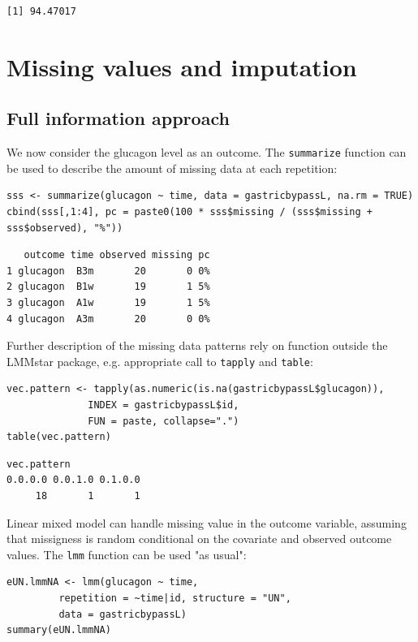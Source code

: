 \documentclass[12pt]{article}
\begin{document}
\begin{verbatim}
[1] 94.47017
\end{verbatim}



\clearpage

\section{Missing values and imputation}
\label{sec:orgdebd495}

\subsection{Full information approach}
\label{sec:org83ba683}

We now consider the glucagon level as an outcome. The \texttt{summarize}
function can be used to describe the amount of missing data at each
repetition:
\lstset{language=r,label= ,caption= ,captionpos=b,numbers=none}
\begin{lstlisting}
sss <- summarize(glucagon ~ time, data = gastricbypassL, na.rm = TRUE)
cbind(sss[,1:4], pc = paste0(100 * sss$missing / (sss$missing + sss$observed), "%"))
\end{lstlisting}

\begin{verbatim}
   outcome time observed missing pc
1 glucagon  B3m       20       0 0%
2 glucagon  B1w       19       1 5%
3 glucagon  A1w       19       1 5%
4 glucagon  A3m       20       0 0%
\end{verbatim}


Further description of the missing data patterns rely on function
outside the LMMstar package, e.g. appropriate call to \texttt{tapply} and
\texttt{table}:
\lstset{language=r,label= ,caption= ,captionpos=b,numbers=none}
\begin{lstlisting}
vec.pattern <- tapply(as.numeric(is.na(gastricbypassL$glucagon)),
		      INDEX = gastricbypassL$id,
		      FUN = paste, collapse=".")
table(vec.pattern)
\end{lstlisting}

\begin{verbatim}
vec.pattern
0.0.0.0 0.0.1.0 0.1.0.0 
     18       1       1
\end{verbatim}


Linear mixed model can handle missing value in the outcome variable,
assuming that missigness is random conditional on the covariate and
observed outcome values. The \texttt{lmm} function can be used "as usual":
\lstset{language=r,label= ,caption= ,captionpos=b,numbers=none}
\begin{lstlisting}
eUN.lmmNA <- lmm(glucagon ~ time,
		 repetition = ~time|id, structure = "UN",
		 data = gastricbypassL)
summary(eUN.lmmNA)
\end{lstlisting}
\end{document}
